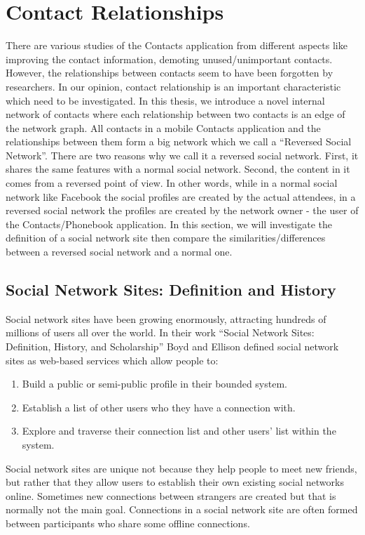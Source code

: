 \section{Contact Relationships}\label{contactrelationships}
There are various studies of the Contacts application from different aspects like improving the contact information, demoting unused/unimportant contacts. However, the relationships between contacts seem to have been forgotten by researchers. In our opinion, contact relationship is an important characteristic which need to be investigated. In this thesis, we introduce a novel internal network of contacts where each relationship between two contacts is an edge of the network graph. All contacts in a mobile Contacts application and the relationships between them form a big network which we call a ``Reversed Social Network''. There are two reasons why we call it a reversed social network. First, it shares the same features with a normal social network. Second, the content in it comes from a reversed point of view. In other words, while in a normal social network like Facebook the social profiles are created by the actual attendees, in a reversed social network the profiles are created by the network owner - the user of the Contacts/Phonebook application. In this section, we will investigate the definition of a social network site then compare the similarities/differences between a reversed social network and a normal one.

\subsection{Social Network Sites: Definition and History}
Social network sites have been growing enormously, attracting hundreds of millions of users all over the world. In their work ``Social Network Sites: Definition, History, and Scholarship'' \cite{boyd2010social} Boyd and Ellison defined social network sites as web-based services which allow people to:

\begin{enumerate}
  \item Build a public or semi-public profile in their bounded system.
  \item Establish a list of other users who they have a connection with.
  \item Explore and traverse their connection list and other users' list within the system.
\end{enumerate}

Social network sites are unique not because they help people to meet new friends, but rather that they allow users to establish their own existing social networks online. Sometimes new connections between strangers are created but that is normally not the main goal. Connections in a social network site are often formed between participants who share some offline connections.

